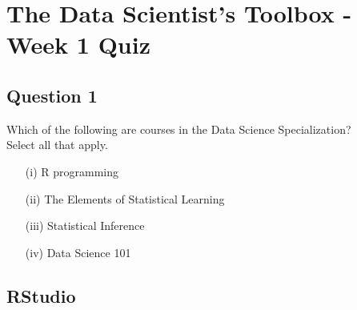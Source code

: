 \documentclass[12pt]{article}
\begin{document}
\section*{The Data Scientist’s Toolbox - Week 1 Quiz}




\newpage
\subsection*{Question 1}

Which of the following are courses in the Data Science Specialization? \\ Select all that apply.
\begin{itemize}
\item[(i)] R programming 

\item[(ii)] The Elements of Statistical Learning 

\item[(iii)] Statistical Inference 

\item[(iv)] Data Science 101 
\end{itemize}

\newpage
\subsection*{RStudio}
\end{document}
